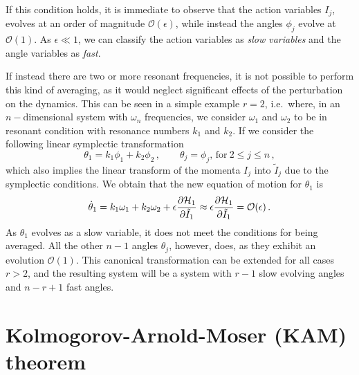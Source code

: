 If this condition holds, it is immediate to observe that the action variables $I_j$, evolves at an order of magnitude $\mathcal{O}(\epsilon)$, while instead the angles $\phi_j$ evolve at $\mathcal{O}(1)$. As $\epsilon \ll 1$, we can classify the action variables as \textit{slow variables} and the angle variables as \textit{fast}.

If instead there are two or more resonant frequencies, it is not possible to perform this kind of averaging, as it would neglect significant effects of the perturbation on the dynamics. This can be seen in a simple example $r=2$, i.e.\ where, in an $n-$dimensional system with $\omega_n$ frequencies, we consider $\omega_1$ and $\omega_2$ to be in resonant condition with resonance numbers $k_1$ and $k_2$. If we consider the following linear symplectic transformation
\begin{equation}
    \theta_1 = k_1 \phi_1 + k_2 \phi_2\,,\qquad \theta_j=\phi_j,\, \text{for}\ 2\leq j \leq n\,,
\end{equation}
which also implies the linear transform of the momenta $I_j$ into $\tilde I_j$ due to the symplectic conditions. We obtain that the new equation of motion for $\theta_1$ is
\begin{equation}
    \dot\theta_1 = k_1\omega_1 + k_2\omega_2 + \epsilon \pdv{\mathcal{H}_1}{\tilde I_1} \approx \epsilon \pdv{\mathcal{H}_1}{\tilde I_1} = \mathcal{O}(\epsilon)\,.
\end{equation}
As $\theta_1$ evolves as a slow variable, it does not meet the conditions for being averaged. All the other $n - 1$ angles $\theta_j$, however, does, as they exhibit an evolution $\mathcal{O}(1)$. This canonical transformation can be extended for all cases $r>2$, and the resulting system will be a system with $r - 1$ slow evolving angles and $n - r + 1$ fast angles.  



\section{Kolmogorov-Arnold-Moser (KAM) theorem}\label{sec:1:kam}

